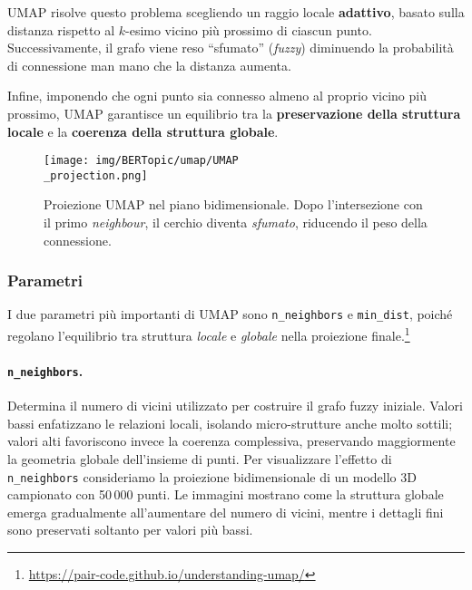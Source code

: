 UMAP risolve questo problema scegliendo un raggio locale \textbf{adattivo}, basato sulla distanza rispetto al $k$-esimo vicino più prossimo di ciascun punto. Successivamente, il grafo viene reso ``sfumato'' (\textit{fuzzy}) diminuendo la probabilità di connessione man mano che la distanza aumenta.

Infine, imponendo che ogni punto sia connesso almeno al proprio vicino più prossimo, UMAP garantisce un equilibrio tra la \textbf{preservazione della struttura locale} e la \textbf{coerenza della struttura globale}.
\begin{figure}[H]
\centering
\texttt{[image: img/BERTopic/umap/UMAP\\\_projection.png]}
\caption{Proiezione UMAP nel piano bidimensionale. Dopo l'intersezione con il primo \emph{neighbour}, il cerchio diventa \emph{sfumato}, riducendo il peso della connessione.\protect\footnotemark}
\label{fig:umap-projection}
\end{figure}
\subsubsection{Parametri}
I due parametri più importanti di UMAP sono \texttt{n\_neighbors} e \texttt{min\_dist}, poiché regolano l'equilibrio tra struttura \textit{locale} e \textit{globale} nella proiezione finale.\footnote{\url{https://pair-code.github.io/understanding-umap/}}

\paragraph{\texttt{n\_neighbors}.} Determina il numero di vicini utilizzato per costruire il grafo fuzzy iniziale. Valori bassi enfatizzano le relazioni locali, isolando micro-strutture anche molto sottili; valori alti favoriscono invece la coerenza complessiva, preservando maggiormente la geometria globale dell'insieme di punti.
Per visualizzare l'effetto di \texttt{n\_neighbors} consideriamo la proiezione bidimensionale di un modello 3D campionato con 50\,000 punti. Le immagini mostrano come la struttura globale emerga gradualmente all'aumentare del numero di vicini, mentre i dettagli fini sono preservati soltanto per valori più bassi.

